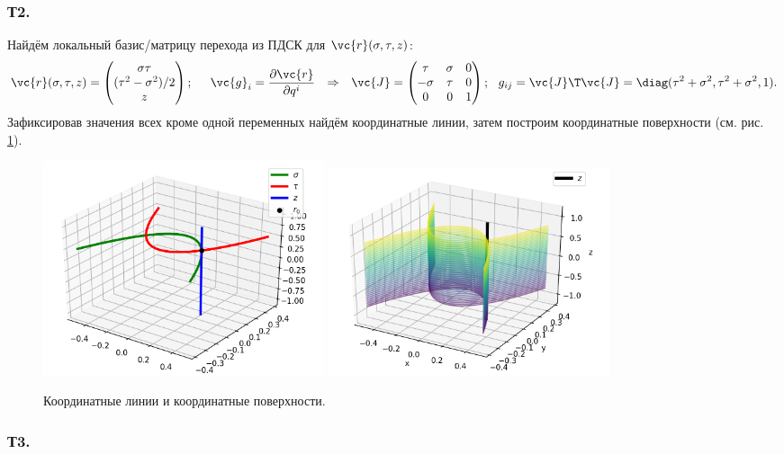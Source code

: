 \subsubsection*{Т2.}
Найдём локальный базис/матрицу перехода из ПДСК для $\vc{r}(\sigma, \tau, z)$:
$$
    \vc{r}(\sigma, \tau, z) =
    \begin{pmatrix}
        \sigma\tau \\ (\tau^2 - \sigma^2)/2 \\ z
    \end{pmatrix};
    \hspace{0.5cm} 
    \vc{g}_i = \frac{\partial \vc{r}}{\partial q^i} 
    \hspace{0.25cm} \Rightarrow \hspace{0.25cm} 
    \vc{J} = 
    \begin{pmatrix}
        \tau & \sigma & 0 \\
        -\sigma & \tau & 0 \\
        0 & 0 & 1
    \end{pmatrix};
    \hspace{0.25cm} 
    g_{ij} = \vc{J}\T \vc{J} = \diag (\tau^2 + \sigma^2, \tau^2 + \sigma^2, 1).
$$
Зафиксировав значения всех кроме одной переменных найдём координатные линии, затем построим координатные поверхности (см. рис. \ref{fig:1}).
\begin{figure}[h]
    \centering
    \includegraphics[width=0.4\textwidth]{img/1_2.png}
    \includegraphics[width=0.4\textwidth]{img/1_2_2.png}
    \caption{Координатные линии и координатные поверхности.}
    \label{fig:1}
\end{figure}

\subsubsection*{Т3.}

